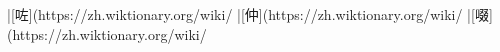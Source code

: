 |[咗](https://zh.wiktionary.org/wiki/%
|[仲](https://zh.wiktionary.org/wiki/%
|[啜](https://zh.wiktionary.org/wiki/%